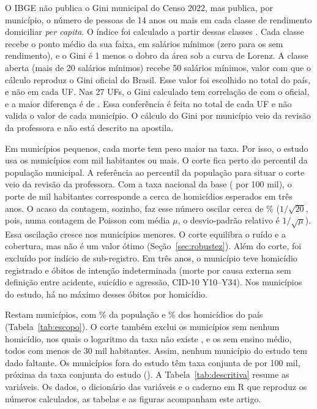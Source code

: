 \documentclass[a4paper,11pt]{article}
\begin{document}
O IBGE não publica o Gini municipal do Censo 2022, mas publica, por município, o número de pessoas de 14 anos ou mais em cada classe de rendimento domiciliar \textit{per capita}. O índice foi calculado a partir dessas classes \citep{gastwirth1972}. Cada classe recebe o ponto médio da sua faixa, em salários mínimos (zero para os sem rendimento), e o Gini é 1 menos o dobro da área sob a curva de Lorenz. A classe aberta (mais de 20 salários mínimos) recebe 50 salários mínimos, valor com que o cálculo reproduz o Gini oficial do Brasil. Esse valor foi escolhido no total do país, e não em cada UF. Nas 27 UFs, o Gini calculado tem correlação de \nGiniCorUF{} com o oficial, e a maior diferença é de \nGiniDifUF. Essa conferência é feita no total de cada UF e não valida o valor de cada município. O cálculo do Gini por município veio da revisão da professora e não está descrito na apostila.

Em municípios pequenos, cada morte tem peso maior na taxa. Por isso, o estudo usa os municípios com \nPopMin{} mil habitantes ou mais. O corte fica perto do percentil \nPercCorte{} da população municipal. A referência ao percentil da população para situar o corte veio da revisão da professora. Com a taxa nacional da base (\nTaxaBR{} por 100 mil), o porte de \nPopMin{} mil habitantes corresponde a cerca de \nCasosEspCorte{} homicídios esperados em três anos. O acaso da contagem, sozinho, faz esse número oscilar cerca de \nOscCorte\% ($1/\sqrt{20}$, pois, numa contagem de Poisson com média $\mu$, o desvio-padrão relativo é $1/\sqrt{\mu}$). Essa oscilação cresce nos municípios menores. O corte equilibra o ruído e a cobertura, mas não é um valor ótimo (Seção~\ref{sec:robustez}). Além do corte, \nForaNome{} foi excluído por indício de sub-registro. Em três anos, o município teve \nForaHom{} homicídio registrado e \nForaIndet{} óbitos de intenção indeterminada (morte por causa externa sem definição entre acidente, suicídio e agressão, CID-10 Y10--Y34). Nos municípios do estudo, há no máximo \nRazIndetMax{} desses óbitos por homicídio.

Restam \nMunEsc{} municípios, com \nPctPopEsc\% da população e \nPctHomEsc\% dos homicídios do país (Tabela~\ref{tab:escopo}). O corte também exclui os \nMunZeroHom{} municípios sem nenhum homicídio, nos quais o logaritmo da taxa não existe \citep{duarte2012}, e os \nMunSemEM{} sem ensino médio, todos com menos de 30 mil habitantes. Assim, nenhum município do estudo tem dado faltante. Os \nMunFora{} municípios fora do estudo têm taxa conjunta de \nTaxaFora{} por 100 mil, próxima da taxa conjunta do estudo (\nTaxaEsc). A Tabela~\ref{tab:descritiva} resume as variáveis. Os dados, o dicionário das variáveis e o caderno em R que reproduz os números calculados, as tabelas e as figuras acompanham este artigo.
\end{document}
